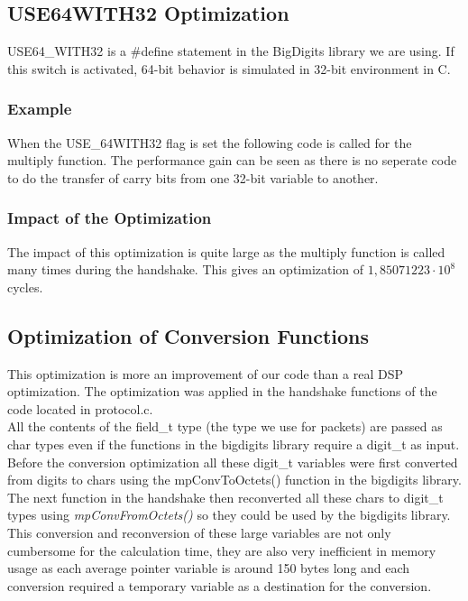 \documentclass[a4paper]{article}
\begin{document}
\subsection{USE64WITH32 Optimization}
USE64\_WITH32 is a $\#$define statement in the BigDigits library we are using. If this switch is activated, 64-bit behavior is simulated in 32-bit environment in C.

\subsubsection{Example}
When the USE\_64WITH32 flag is set the following code is called for the multiply function. The performance gain can be seen as there is no seperate code to do the transfer of carry bits from one 32-bit variable to another.



\subsubsection{Impact of the Optimization}
The impact of this optimization is quite large as the multiply function is called many times during the handshake. This gives an optimization of $1,85071223\cdot10^{8}$ cycles.

\subsection{Optimization of Conversion Functions}
This optimization is more an improvement of our code than a real DSP optimization. The optimization was applied in the handshake functions of the code located in protocol.c.\\

All the contents of the field\_t type (the type we use for packets) are passed as char types even if the functions in the bigdigits library require a digit\_t as input. Before the conversion optimization all these digit\_t variables were first converted from digits to chars using the mpConvToOctets() function in the bigdigits library. The next function in the handshake then reconverted all these chars to digit\_t types using \textit{mpConvFromOctets()} so they could be used by the bigdigits library.\\

This conversion and reconversion of these large variables are not only cumbersome for the calculation time, they are also very inefficient in memory usage as each average pointer variable is around 150 bytes long and each conversion required a temporary variable as a destination for the conversion.\\
\end{document}
